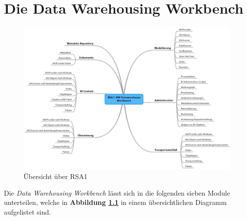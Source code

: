 \chapter{Die Data Warehousing Workbench}
\label{Abschnitt:Motivation}

\begin{figure}[H]
    \centering
    \includegraphics[width=1\textwidth]{files/RSA1Mindmap}
    \caption{Übersicht über RSA1}
    \label{pic:RSA1}
\end{figure}


Die \textit{ Data Warehousing Workbench} lässt sich in die folgenden sieben Module unterteilen, welche in \textbf{Abbildung \ref{pic:RSA1}} in einem übersichtlichen Diagramm aufgelistet sind.\\

